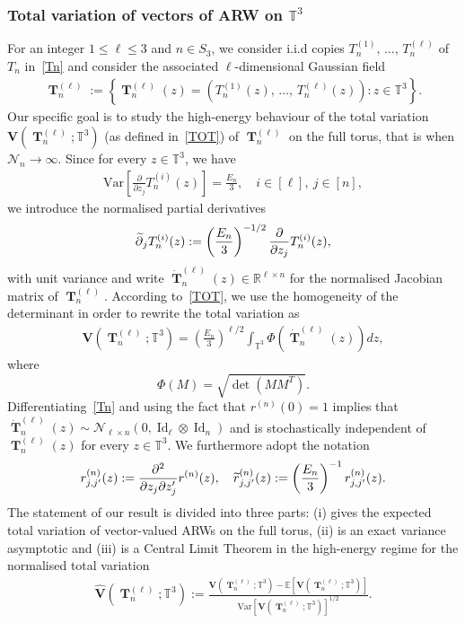 \documentclass[10pt]{amsart}
\theoremstyle{definition}\newtheorem{defi}[theo]{Definition}\newtheorem{rema}[theo]{Remark}\newtheorem{exam}[theo]{Example}\newtheorem{exem}[theo]{Example}\newtheorem{nota}[theo]{Notation}
\DeclareMathOperator{\Id}{Id}
\DeclareMathOperator{\bT}{\mathbf{T}}
\newcommand{\scN}{\mathscr{N}}
\newcommand{\bfv}{\mathbf{V}}
\newcommand{\R}{\mathbb{R}}
\newcommand{\T}{\mathbb{T}^3}
\newcommand{\E}[1]{\mathbb{E}\left[#1\right]}
\newcommand{\V}[1]{\mathrm{Var}{\left[#1\right]}}
\newcommand{\Nn}{\mathcal{N}_n}
\let\oldtilde\tilde
\renewcommand*{\tilde}[1]{\mathchoice{\widetilde{#1}}{\widetilde{#1}}{\oldtilde{#1}}{\oldtilde{#1}}}
\begin{document}
\subsubsection*{Total variation of vectors of ARW on $\T$}
For an integer $1\leq \ell \leq 3$ and $n\in S_3$, we consider i.i.d copies $T_n^{(1)},\,\ldots,\,T_n^{(\ell)}$ of $T_n$ in~\eqref{Tn} and consider the associated $\ell$-dimensional Gaussian field
\begin{gather}\label{MultiARW}
\bT_n^{(\ell)}:=\left\{\bT_n^{(\ell)}(z)=\left(T_n^{(1)}(z),\,\ldots,\,T_n^{(\ell)}(z)\right):z \in \T\right\}.
\end{gather}
Our specific goal is to study the high-energy behaviour of the total variation $\bfv(\bT_n^{(\ell)}; \T)$ (as defined in~\eqref{TOT}) of $\bT_n^{(\ell)}$ on the full torus, that is when $\Nn\to \infty$. Since for every $z \in \T$, we have
\begin{gather*}
\V{\frac{\partial}{\partial {z_j}} T_n^{(i)}(z)} = \frac{E_n}{3}, \quad i\in [\ell], \ j \in [n],
\end{gather*}
we introduce the normalised partial derivatives
\begin{gather}\label{dernor}
\tilde{\partial}_{j}T_n^{(i)}(z) := \left(\frac{E_n}{3}\right)^{-1/2} \frac{\partial}{\partial {z_j}}T_n^{(i)}(z),
\end{gather}
with unit variance and write $\dot{\bT}_n^{(\ell)}(z) \in \R^{\ell \times n}$ for the normalised Jacobian matrix of $\bT_n^{(\ell)}$. According to~\eqref{TOT}, we use the homogeneity of the determinant in order to rewrite the total variation as
\begin{gather}\label{totdef}
\bfv\left(\bT_n^{(\ell)};\T\right) = \left(\frac{E_n}{3}\right)^{\ell/2}\int_{\T} \Phi\left(\dot{\bT}_n^{(\ell)}(z)\right) dz,
\end{gather}
where 
\[
\Phi(M)=\sqrt{\det\left(MM^T\right)}.
\]
Differentiating~\eqref{Tn} and using the fact that $r^{(n)}(0)=1$ implies that $\dot{\bT}_n^{(\ell)}(z) \sim \scN_{\ell \times n}(0, \Id_{\ell}\otimes \Id_n)$ and is stochastically independent of $\bT_n^{(\ell)}(z)$ for every $z \in \T$. We furthermore adopt the notation
\begin{gather}\label{rnnor}
{r}^{(n)}_{j,j'}(z) := \frac{\partial^2}{\partial z_j \partial z_j' } r^{(n)}(z), \quad
\tilde{r}^{(n)}_{j,j'}(z):=\left(\frac{E_n}{3}\right)^{-1} r^{(n)}_{j,j'}(z).
\end{gather}
The statement of our result is divided into three parts: (i) gives the expected total variation of vector-valued ARWs on the full torus, (ii) is an exact variance asymptotic and (iii) is a Central Limit Theorem in the high-energy regime for the normalised total variation
\begin{gather}\label{nor}
\widehat{\bfv}\left(\bT_n^{(\ell)};\T\right):=\frac{ \bfv\left(\bT_n^{(\ell)};\T\right)-\E{\bfv\left(\bT_n^{(\ell)};\T\right)}}{\V{\bfv\left(\bT_n^{(\ell)};\T\right)}^{1/2}}.
\end{gather}
\end{document}

